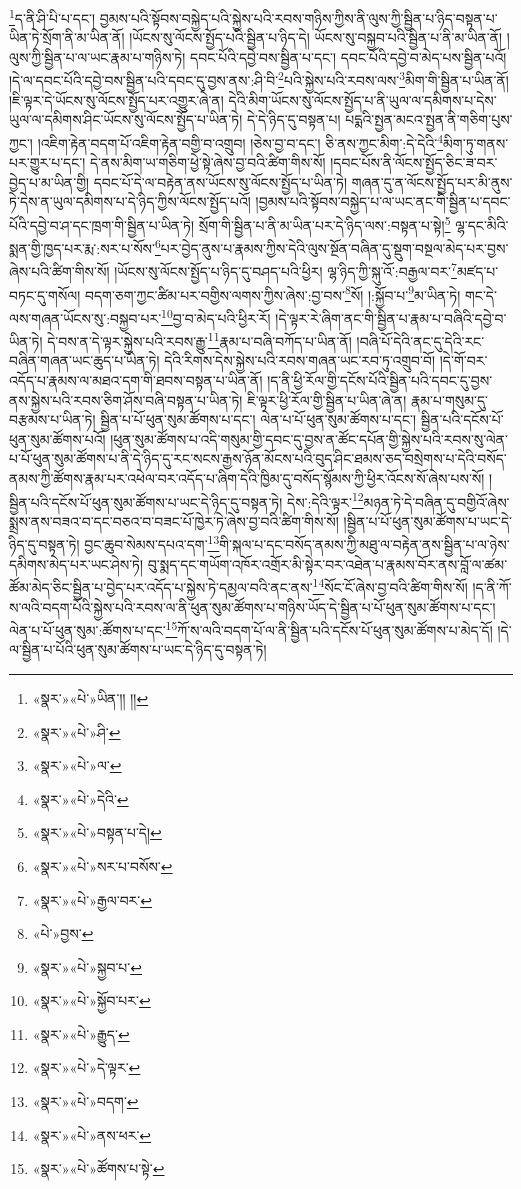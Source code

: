 \footnote{«སྣར་»«པེ་»ཡིན་།། །།}ད་ནི་ཤི་པི་པ་དང་། བྱམས་པའི་སྟོབས་བསྐྱེད་པའི་སྐྱེས་པའི་རབས་གཉིས་ཀྱིས་ནི་ལུས་ཀྱི་སྦྱིན་པ་ཉིད་བསྟན་པ་ཡིན་ཏེ་སྲོག་ནི་མ་ཡིན་ནོ། །ཡོངས་སུ་ལོངས་སྤྱོད་པའི་སྦྱིན་པ་ཉིད་དེ། ཡོངས་སུ་བསྐྱབ་པའི་སྦྱིན་པ་ནི་མ་ཡིན་ནོ། །ལུས་ཀྱི་སྦྱིན་པ་ལ་ཡང་རྣམ་པ་གཉིས་ཏེ། དབང་པོའི་དབྱེ་བས་སྦྱིན་པ་དང་། དབང་པོའི་དབྱེ་བ་མེད་པས་སྦྱིན་པའོ། །དེ་ལ་དབང་པོའི་དབྱེ་བས་སྦྱིན་པའི་དབང་དུ་བྱས་ནས་:ཤི་བི་\footnote{«སྣར་»«པེ་»ཤི་}པའི་སྐྱེས་པའི་རབས་ལས་\footnote{«སྣར་»«པེ་»ལ་}མིག་གི་སྦྱིན་པ་ཡིན་ནོ། །ཇི་ལྟར་དེ་ཡོངས་སུ་ལོངས་སྤྱོད་པར་འགྱུར་ཞེ་ན། དེའི་མིག་ཡོངས་སུ་ལོངས་སྤྱོད་པ་ནི་ཡུལ་ལ་དམིགས་པ་དེས་ཡུལ་ལ་དམིགས་ཤིང་ཡོངས་སུ་ལོངས་སྤྱོད་པ་ཡིན་ཏེ། དེ་དེ་ཉིད་དུ་བསྟན་པ། པདྨའི་སྤྱན་མངའ་སྤྱན་ནི་གཅིག་པུས་ཀྱང་། །འཇིག་རྟེན་བདག་པོ་འཇིག་རྟེན་བགྱི་བ་འགྲུབ། །ཅེས་བྱ་བ་དང་། ཅི་ནས་ཀྱང་མིག་:དེ་དེའི་\footnote{«སྣར་»«པེ་»དེའི་}མིག་ཏུ་གནས་པར་གྱུར་པ་དང་། དེ་ནས་མིག་ཡ་གཅིག་ཕྱེ་སྟེ་ཞེས་བྱ་བའི་ཚིག་གིས་སོ། །དབང་པོས་ནི་ལོངས་སྤྱོད་ཅིང་ཟ་བར་བྱེད་པ་མ་ཡིན་གྱི། དབང་པོ་དེ་ལ་བརྟེན་ནས་ཡོངས་སུ་ལོངས་སྤྱོད་པ་ཡིན་ཏེ། གཞན་དུ་ན་ལོངས་སྤྱོད་པར་མི་ནུས་ཏེ་དེས་ན་ཡུལ་དམིགས་པ་དེ་ཉིད་ཀྱིས་ལོངས་སྤྱོད་པའོ། །བྱམས་པའི་སྟོབས་བསྐྱེད་པ་ལ་ཡང་ནང་གི་སྦྱིན་པ་དབང་པོའི་དབྱེ་བ་ཤ་དང་ཁྲག་གི་སྦྱིན་པ་ཡིན་ཏེ། སྲོག་གི་སྦྱིན་པ་ནི་མ་ཡིན་པར་དེ་ཉིད་ལས་:བསྟན་པ་སྟེ།\footnote{«སྣར་»«པེ་»བསྟན་པ་དེ།} ལྷ་དང་མིའི་སྨན་གྱི་ཁྱད་པར་རྨ་:སར་པ་སོས་\footnote{«སྣར་»«པེ་»སར་པ་བསོས་}པར་བྱེད་ནུས་པ་རྣམས་ཀྱིས་དེའི་ལུས་སྔོན་བཞིན་དུ་སྡུག་བསྔལ་མེད་པར་བྱས་ཞེས་པའི་ཚིག་གིས་སོ། །ཡོངས་སུ་ལོངས་སྤྱོད་པ་ཉིད་དུ་བཤད་པའི་ཕྱིར། ལྷ་ཉིད་ཀྱི་སྐུ་འོ་:བརྒྱལ་བར་\footnote{«སྣར་»«པེ་»རྒྱལ་བར་}མཛད་པ་བཏང་དུ་གསོལ། བདག་ཅག་ཀྱང་ཚིམ་པར་བགྱིས་ལགས་ཀྱིས་ཞེས་:བྱ་བས་\footnote{«པེ་»བྱས་}སོ། །:སྐྱོབ་པ་\footnote{«སྣར་»«པེ་»སྐྱབ་པ་}མ་ཡིན་ཏེ། གང་དེ་ལས་གཞན་ཡོངས་སུ་:བསྐྱབ་པར་\footnote{«སྣར་»«པེ་»སྐྱོབ་པར་}བྱ་བ་མེད་པའི་ཕྱིར་རོ། །དེ་ལྟར་རེ་ཞིག་ནང་གི་སྦྱིན་པ་རྣམ་པ་བཞིའི་དབྱེ་བ་ཡིན་ཏེ། དེ་བས་ན་དེ་ལྟར་སྐྱེས་པའི་རབས་རྒྱུ་\footnote{«སྣར་»«པེ་»རྒྱུད་}རྣམ་པ་བཞི་བཀོད་པ་ཡིན་ནོ། །བཞི་པོ་དེའི་ནང་དུ་དེའི་རང་བཞིན་གཞན་ཡང་ཆུད་པ་ཡིན་ཏེ། དེའི་རིགས་དེས་སྐྱེས་པའི་རབས་གཞན་ཡང་རབ་ཏུ་འགྲུབ་བོ། །དེ་གོ་བར་འདོད་པ་རྣམས་ལ་མཐའ་དག་གི་ཐབས་བསྟན་པ་ཡིན་ནོ། །ད་ནི་ཕྱི་རོལ་གྱི་དངོས་པོའི་སྦྱིན་པའི་དབང་དུ་བྱས་ནས་སྐྱེས་པའི་རབས་ཅིག་ཤོས་བཞི་བསྟན་པ་ཡིན་ཏེ། ཇི་ལྟར་ཕྱི་རོལ་གྱི་སྦྱིན་པ་ཡིན་ཞེ་ན། རྣམ་པ་གསུམ་དུ་བརྩམས་པ་ཡིན་ཏེ། སྦྱིན་པ་པོ་ཕུན་སུམ་ཚོགས་པ་དང་། ལེན་པ་པོ་ཕུན་སུམ་ཚོགས་པ་དང་། སྦྱིན་པའི་དངོས་པོ་ཕུན་སུམ་ཚོགས་པའོ། །ཕུན་སུམ་ཚོགས་པ་འདི་གསུམ་གྱི་དབང་དུ་བྱས་ན་ཚོང་དཔོན་གྱི་སྐྱེས་པའི་རབས་སུ་ལེན་པ་པོ་ཕུན་སུམ་ཚོགས་པ་ནི་དེ་ཉིད་དུ་རང་སངས་རྒྱས་ཉོན་མོངས་པའི་བུད་ཤིང་ཐམས་ཅད་བསྲེགས་པ་དེའི་བསོད་ནམས་ཀྱི་ཚོགས་རྣམ་པར་འཕེལ་བར་འདོད་པ་ཞིག་དེའི་ཁྱིམ་དུ་བསོད་སྙོམས་ཀྱི་ཕྱིར་འོངས་སོ་ཞེས་པས་སོ། །སྦྱིན་པའི་དངོས་པོ་ཕུན་སུམ་ཚོགས་པ་ཡང་དེ་ཉིད་དུ་བསྟན་ཏེ། དེས་:དེའི་ལྟར་\footnote{«སྣར་»«པེ་»དེ་ལྟར་}མཉན་ཏེ་དེ་བཞིན་དུ་བགྱིའོ་ཞེས་སྨྲས་ནས་བཟའ་བ་དང་བཅའ་བ་བཟང་པོ་ཁྱེར་ཏེ་ཞེས་བྱ་བའི་ཚིག་གིས་སོ། །སྦྱིན་པ་པོ་ཕུན་སུམ་ཚོགས་པ་ཡང་དེ་ཉིད་དུ་བསྟན་ཏེ། བྱང་ཆུབ་སེམས་དཔའ་དག་\footnote{«སྣར་»«པེ་»བདག་}གི་སྐལ་པ་དང་བསོད་ནམས་ཀྱི་མཐུ་ལ་བརྟེན་ནས་སྦྱིན་པ་ལ་ཉེས་དམིགས་མེད་པར་ཡང་ཤེས་ཏེ། བུ་སྨད་དང་གཡོག་འཁོར་འགྲོར་མི་སྟེར་བར་འཐེན་པ་རྣམས་བོར་ནས་བློ་ལ་ཚམ་ཚོམ་མེད་ཅིང་སྦྱིན་པ་བྱེད་པར་འདོད་པ་སྐྱེས་ཏེ་དམྱལ་བའི་ནང་ནས་\footnote{«སྣར་»«པེ་»ནས་ཕར་}སོང་ངོ་ཞེས་བྱ་བའི་ཚིག་གིས་སོ། །ད་ནི་ཀོ་ས་ལའི་བདག་པོའི་སྐྱེས་པའི་རབས་ལ་ནི་ཕུན་སུམ་ཚོགས་པ་གཉིས་ཡོད་དེ་སྦྱིན་པ་པོ་ཕུན་སུམ་ཚོགས་པ་དང་། ལེན་པ་པོ་ཕུན་སུམ་:ཚོགས་པ་དང་\footnote{«སྣར་»«པེ་»ཚོགས་པ་སྟེ་}ཀོ་ས་ལའི་བདག་པོ་ལ་ནི་སྦྱིན་པའི་དངོས་པོ་ཕུན་སུམ་ཚོགས་པ་མེད་དོ། །དེ་ལ་སྦྱིན་པ་པོའི་ཕུན་སུམ་ཚོགས་པ་ཡང་དེ་ཉིད་དུ་བསྟན་ཏེ། 